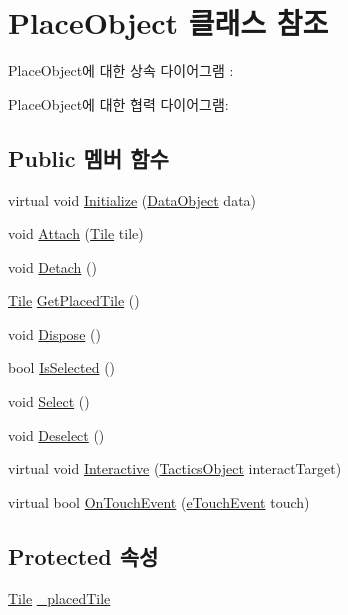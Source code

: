 \hypertarget{class_place_object}{}\section{Place\+Object 클래스 참조}
\label{class_place_object}


Place\+Object에 대한 상속 다이어그램 \+: 


Place\+Object에 대한 협력 다이어그램\+:
\subsection*{Public 멤버 함수}
\begin{DoxyCompactItemize}
\item 
virtual void \hyperlink{class_place_object_a57f8bb8f58e18a673e3114a8227697db}{Initialize} (\hyperlink{class_data_object}{Data\+Object} data)
\item 
void \hyperlink{class_place_object_aa0f1a877d0abc20133e390d0964602ed}{Attach} (\hyperlink{class_tile}{Tile} tile)
\item 
void \hyperlink{class_place_object_a5bcf3ff3fd935121fbd699a08da217e2}{Detach} ()
\item 
\hyperlink{class_tile}{Tile} \hyperlink{class_place_object_a55363002bd68063cf079185a5729b76c}{Get\+Placed\+Tile} ()
\item 
void \hyperlink{class_place_object_aeac9db9685cc3134a90b6a2578046933}{Dispose} ()
\item 
bool \hyperlink{class_place_object_a55fd3f2bd6cccd98390c675371ab723e}{Is\+Selected} ()
\item 
void \hyperlink{class_place_object_a76b1b569fa2aa204ee8e2cb6a350694d}{Select} ()
\item 
void \hyperlink{class_place_object_ad54985fa9ccaf2df149af83b4f17892e}{Deselect} ()
\item 
virtual void \hyperlink{class_tactics_object_a5f94ed01497a7072a2785163f4cbc57b}{Interactive} (\hyperlink{class_tactics_object}{Tactics\+Object} interact\+Target)
\item 
virtual bool \hyperlink{class_tactics_object_af34052e62ea471d21e4c601cc79ff717}{On\+Touch\+Event} (\hyperlink{_touch_manager_8cs_ae33e321a424fe84ba8b2fdb81ad40a68}{e\+Touch\+Event} touch)
\end{DoxyCompactItemize}
\subsection*{Protected 속성}
\begin{DoxyCompactItemize}
\item 
\hyperlink{class_tile}{Tile} \hyperlink{class_place_object_a2006d9f7ffcf8aba6f731ebfc9b0af35}{\+\_\+placed\+Tile}
\end{DoxyCompactItemize}

